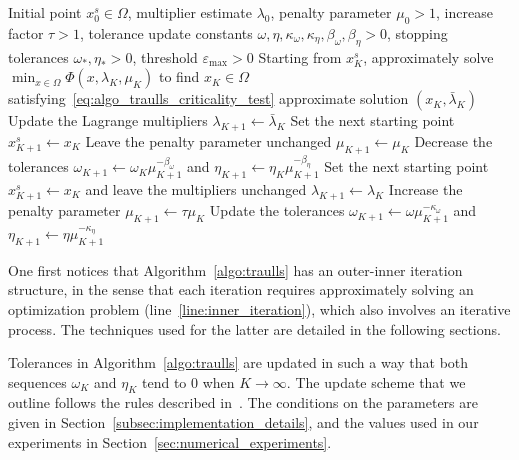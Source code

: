 \documentclass[pdflatex,sn-mathphys-num]{sn-jnl}%
\theoremstyle{thmstyleone}%
\newcommand{\calT}{{\mathcal{T}}}
\newcommand{\proj}[2]{P_{#1} \left[ {#2} \right]} %
\begin{document}
\begin{algorithm}
	\caption{Augmented Lagrangian algorithm}\label{algo:traulls}
	\begin{algorithmic}[1]
		\Require Initial point $x^s_0 \in \Omega$, multiplier estimate $\lambda_0$, penalty parameter $\mu_0 > 1$, increase factor $\tau > 1$, tolerance update constants $\omega,\eta,\kappa_\omega,\kappa_\eta,\beta_\omega,\beta_\eta > 0$, stopping tolerances $\omega_*,\eta_* > 0$, threshold $\varepsilon_{\max} > 0$
		\State\label{line:inner_iteration} Starting from $x_K^s$, approximately solve $\min_{x\in \Omega} \Phi(x,\lambda_K,\mu_K)$ to find $x_K \in \Omega$ satisfying~\eqref{eq:algo_traulls_criticality_test}
		\If{\(\|\proj{\calT_{\varepsilon_*}(x_K)}{-\nabla_x\Phi_K}\| \le \omega_*\), with $\varepsilon_* = \min(\varepsilon_{\max},\omega_*)$, and \(\left\Vert c(x_K)\right\Vert \le \eta_*\)}
		 \Return approximate solution $(x_K,\bar{\lambda}_K)$
		\EndIf
		\State Update the Lagrange multipliers $\lambda_{K+1}\gets \bar{\lambda}_K$ 
		\State Set the next starting point $x_{K+1}^s \gets x_K $
		\State Leave the penalty parameter unchanged \(\mu_{K+1} \gets \mu_K\)
		\State Decrease the tolerances $\omega_{K+1}\gets \omega_K \mu_{K+1}^{-\beta_\omega}$ and $\eta_{K+1}\gets \eta_K \mu_{K+1}^{-\beta_\eta}$
		\Else{}
		\State Set the next starting point $x_{K+1}^s \gets x_K$ and leave the multipliers unchanged $\lambda_{K+1} \gets \lambda_K$
		\State Increase the penalty parameter $\mu_{K+1} \gets \tau\mu_K$
		\State Update the tolerances $\omega_{K+1}\gets \omega \mu_{K+1}^{-\kappa_\omega}$ and $\eta_{K+1}\gets \eta \mu_{K+1}^{-\kappa_\eta}$
		\EndIf
		\EndFor
	\end{algorithmic}
\end{algorithm}
One first notices that Algorithm~\ref{algo:traulls} has an outer-inner iteration structure, in the sense that each iteration requires approximately solving an optimization problem (line~\ref{line:inner_iteration}), which also involves an iterative process. The techniques used for the latter are detailed in the following sections.

Tolerances in Algorithm~\ref{algo:traulls} are updated in such a way that both sequences $\omega_K$ and $\eta_K$ tend to $0$ when $K \to \infty$. The update scheme that we outline follows the rules described in~\cite[Algorithm~14.4.2]{conn-etal:2000}. The conditions on the parameters are given in Section~\ref{subsec:implementation_details}, and the values used in our experiments in Section~\ref{sec:numerical_experiments}.
\end{document}
